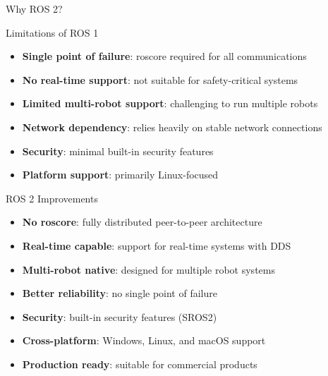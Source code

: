 \begin{frame}[allowframebreaks]{Why ROS 2? }
    \begin{block}{Limitations of ROS 1}
        \begin{itemize}
            \item \textbf{Single point of failure}: roscore required for all communications
            \item \textbf{No real-time support}: not suitable for safety-critical systems
            \item \textbf{Limited multi-robot support}: challenging to run multiple robots
            \item \textbf{Network dependency}: relies heavily on stable network connections
            \item \textbf{Security}: minimal built-in security features
            \item \textbf{Platform support}: primarily Linux-focused
        \end{itemize}
    \end{block}

    \framebreak

    \begin{block}{ROS 2 Improvements}
        \begin{itemize}
            \item \textbf{No roscore}: fully distributed peer-to-peer architecture
            \item \textbf{Real-time capable}: support for real-time systems with DDS
            \item \textbf{Multi-robot native}: designed for multiple robot systems
            \item \textbf{Better reliability}: no single point of failure
            \item \textbf{Security}: built-in security features (SROS2)
            \item \textbf{Cross-platform}: Windows, Linux, and macOS support
            \item \textbf{Production ready}: suitable for commercial products
        \end{itemize}
    \end{block}
\end{frame}

